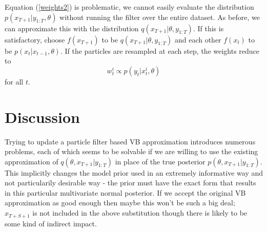 \documentclass[12pt,a4paper]{article}%
\begin{document}
Equation (\ref{weights2}) is problematic, we cannot easily evaluate the distribution $p(x_{T+1} | y_{1:T}, \theta)$ without running the filter over the entire dataset. As before, we can approximate this with the distribution $q(x_{T+1} | \theta, y_{1:T})$. If this is satisfactory, choose $f(x_{T+1})$ to be $q(x_{T+1} | \theta, y_{1:T})$ and each other $f(x_{t})$ to be $p(x_t | x_{t-1}, \theta)$. If the particles are resampled at each step, the weights reduce to 
\begin{equation}
\label{weights6}
w_t^i \propto p(y_t | x_t^i, \theta)
\end{equation}
for all $t$.

\section{Discussion}

Trying to update a particle filter based VB approximation introduces numerous problems, each of which seems to be solvable if we are willing to use the existing approximation of $q(\theta, x_{T+1} | y_{1:T})$ in place of the true posterior $p(\theta, x_{T+1} | y_{1:T})$. This implicitly changes the model prior used in an extremely informative way and not particularily desirable way - the prior must have the exact form that results in this particular multivariate normal posterior.
If we accept the original VB approximation as good enough then maybe this won't be such a big deal; $x_{T+S+1}$ is not included in the above substitution though there is likely to be some kind of indirect impact. 
\end{document}
